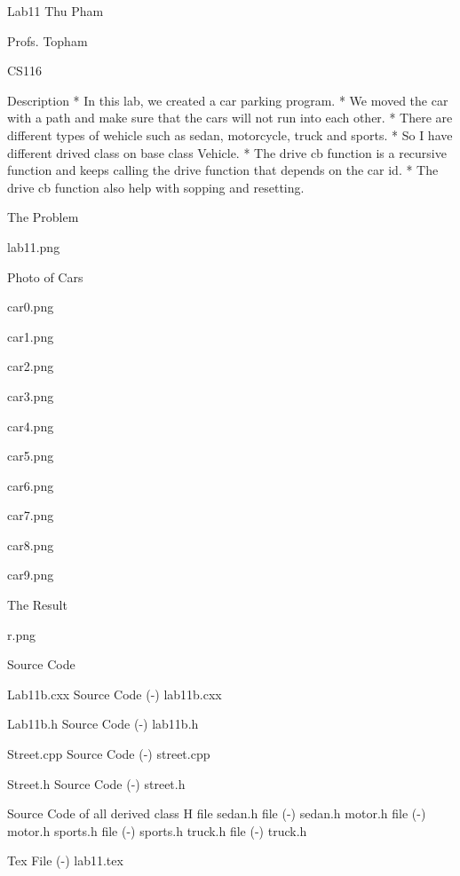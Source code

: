 

\tit Lab11
\maketoc 
Thu Pham

Profs. Topham

CS116

\sec Description
\begitems
* In this lab, we created a car parking program.
* We moved the car with a path and make sure 
that the cars will not run into each other. 
* There are different types of wehicle such as sedan,
 motorcycle, truck and sports. 
* So I have different drived class on base class Vehicle.
* The drive cb function is a recursive function and keeps
calling the drive function that depends on the car id. 
* The drive cb function also help with sopping and resetting.
\enditems

\sec The Problem 

\picw=7in

\inspic lab11.png

\sec Photo of Cars
\picw=2in

\inspic car0.png
\filbreak
\picw=2in

\inspic car1.png
\filbreak
\picw=2in

\inspic car2.png
\filbreak
\picw=2in

\inspic car3.png
\filbreak
\picw=2in

\inspic car4.png
\filbreak
\picw=2in

\inspic car5.png
\filbreak
\picw=2in

\inspic car6.png
\filbreak
\picw=2in

\inspic car7.png
\filbreak
\picw=2in

\inspic car8.png
\filbreak
\picw=2in

\inspic car9.png

\filbreak
\sec The Result
\filbreak
\picw=4in

\inspic r.png


\sec Source Code

\secc Lab11b.cxx Source Code
\verbinput (-) lab11b.cxx

\filbreak
\secc Lab11b.h Source Code
\verbinput (-) lab11b.h

\filbreak
\secc Street.cpp Source Code
\verbinput (-) street.cpp

\filbreak
\secc Street.h Source Code
\verbinput (-) street.h

\sec Source Code of all derived class H file
\secc sedan.h file
\verbinput (-) sedan.h
\secc motor.h file
\verbinput (-) motor.h
\secc sports.h file
\verbinput (-) sports.h
\secc truck.h file
\verbinput (-) truck.h

\sec Tex File
\verbinput (-) lab11.tex

\bye